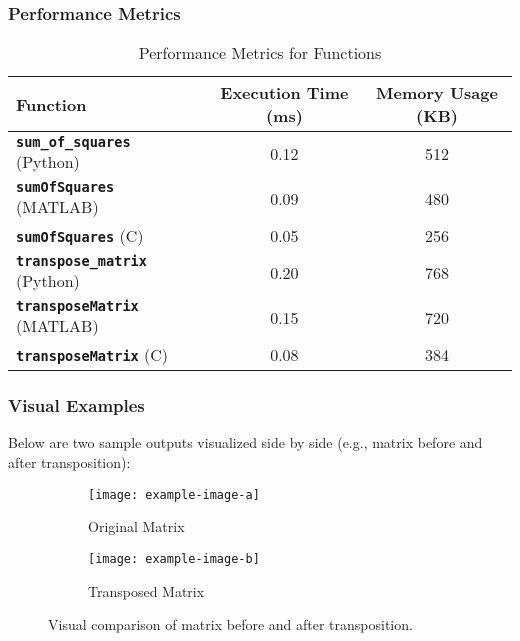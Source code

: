 \documentclass[11pt, a4paper]{article}
\newcommand{\function}[1]{\texttt{\color{blue}\textbf{#1}}}
\begin{document}
	\subsubsection*{Performance Metrics}
	\begin{table}[h]
		\centering
		\caption{Performance Metrics for Functions}
		\begin{tabular}{lcc}
			\toprule
			\textbf{Function} & \textbf{Execution Time (ms)} & \textbf{Memory Usage (KB)} \\
			\midrule
			\function{sum\_of\_squares} (Python) & 0.12 & 512 \\
			\function{sumOfSquares} (MATLAB) & 0.09 & 480 \\
			\function{sumOfSquares} (C) & 0.05 & 256 \\
			\function{transpose\_matrix} (Python) & 0.20 & 768 \\
			\function{transposeMatrix} (MATLAB) & 0.15 & 720 \\
			\function{transposeMatrix} (C) & 0.08 & 384 \\
			\bottomrule
		\end{tabular}
	\end{table}
	
	\subsubsection*{Visual Examples}
	Below are two sample outputs visualized side by side (e.g., matrix before and after transposition):
	\begin{figure}[h]
		\centering
		\begin{subfigure}{0.45\textwidth}
			\centering
			\texttt{[image: example-image-a]}
			\caption{Original Matrix}
		\end{subfigure}
		\hfill
		\begin{subfigure}{0.45\textwidth}
			\centering
			\texttt{[image: example-image-b]}
			\caption{Transposed Matrix}
		\end{subfigure}
		\caption{Visual comparison of matrix before and after transposition.}
	\end{figure}
	
\end{document}
